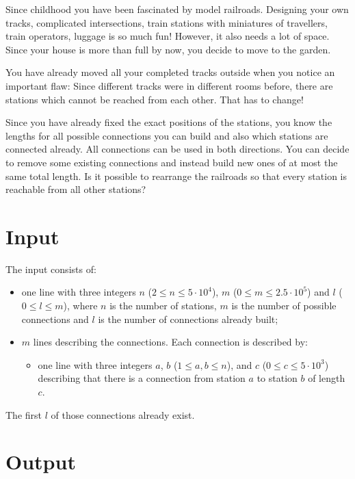 
Since childhood you have been fascinated by model railroads. Designing your own tracks, complicated intersections, train stations with miniatures of travellers, train operators, luggage is so much fun! However, it also needs a lot of space. Since your house is more than full by now, you decide to move to the garden.

You have already moved all your completed tracks outside when you notice an important flaw: Since different tracks were in different rooms before, there are stations which cannot be reached from each other. That has to change!

Since you have already fixed the exact positions of the stations, you know the lengths for all possible connections you can build and also which stations are connected already. All connections can be used in both directions. You can decide to remove some existing connections and instead build new ones of at most the same total length. Is it possible to rearrange the railroads so that every station is reachable from all other stations?

\section*{Input}

The input consists of:
\begin{itemize}
\item one line with three integers $n$ ($2\leq n\leq 5\cdot 10^4$), $m$ ($0\leq m\leq 2.5\cdot 10^5$) and $l$ ($0\leq l\leq m$), where $n$ is the number of stations, $m$ is the number of possible connections and $l$ is the number of connections already built;
\item $m$ lines describing the connections.  Each connection is described by:
\begin{itemize}
\item one line with three integers $a$, $b$ ($1\leq a,b\leq n$), and $c$ ($0\leq c\leq 5\cdot 10^3$) describing that there is a connection from station $a$ to station $b$ of length $c$.
\end{itemize}
\end{itemize}

The first $l$ of those connections already exist.

\section*{Output}

